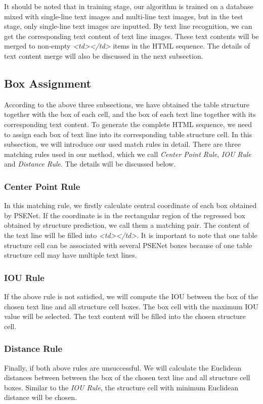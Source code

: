 \documentclass{article}
\begin{document}
It should be noted that in training stage, our algorithm is trained on a database mixed with single-line text images and multi-line text images, but in the test stage, only single-line text images are inputted.
By text line recognition, we can get the corresponding text content of text line images. These text contents will be merged to non-empty \emph{<td></td>} items in the HTML sequence. The details of text content merge will also be discussed in the next subsection.


\subsection{Box Assignment}
According to the above three subsections, we have obtained the table structure together with the box of each cell, and the box of each text line together with its corresponding text content. To generate the complete HTML sequence, we need to assign each box of text line into its corresponding table structure cell.
In this subsection, we will introduce our used match rules in detail. There are three matching rules used in our method, which we call \emph{Center Point Rule}, \emph{IOU Rule} and \emph{Distance Rule}. The details will be discussed below.

\subsubsection{Center Point Rule}
In this matching rule, we firstly calculate central coordinate of each box obtained by PSENet. If the coordinate is in the rectangular region of the regressed box obtained by structure prediction, we call them a matching pair. The content of the text line will be filled into \emph{<td></td>}.
It is important to note that one table structure cell can be associated with several PSENet boxes because of one table structure cell may have multiple text lines. 


\subsubsection{IOU Rule}
If the above rule is not satisfied, we will compute the IOU between the box of the chosen text line and all structure cell boxes. The box cell with the maximum IOU value will be selected. The text content will be filled into the chosen structure cell.


\subsubsection{Distance Rule}
Finally, if both above rules are unsuccessful. We will calculate the Euclidean distances between between the box of the chosen text line and all structure cell boxes. Similar to the \emph{IOU Rule}, the structure cell with minimum Euclidean distance will be chosen.
\end{document}
